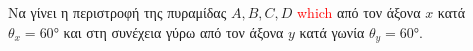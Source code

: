 \begin{exercise}
	Να γίνει η περιστροφή της πυραμίδας $A, B, C, D$ \textcolor{red}{which} από τον άξονα $x$ κατά $\theta_x = \ang{60}$ και στη συνέχεια γύρω από τον άξονα $y$ κατά γωνία $\theta_y = \ang{60}$. 
\end{exercise}

\begin{solution}
	
\end{solution}